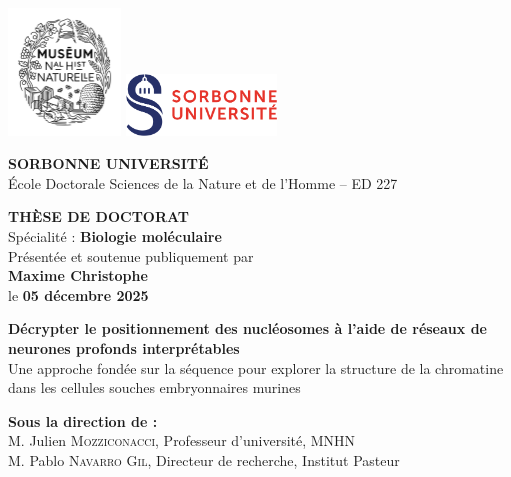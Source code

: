 \documentclass[11pt]{book}
\begin{document}
\begin{titlepage}
    \begin{center}
        \includegraphics[width=3cm]{Figures/MNHN_SCEAU_NOIR.png}
        \hspace{2cm}
        \includegraphics[width=4cm]{Figures/Logo_of_Sorbonne_University.svg.png}
        
        \vspace{0.5cm}
        \Large\textbf{SORBONNE UNIVERSITÉ}\\[0.2cm]
        \large{École Doctorale Sciences de la Nature et de l’Homme -- ED 227}\\[0.5cm]
        
        \fbox{\rule{12cm}{0pt}}
        
        \Large\textbf{THÈSE DE DOCTORAT}\\
        \normalsize{Spécialité : \textbf{Biologie moléculaire}}\\[0.4cm]
        
        Présentée et soutenue publiquement par\\
        \Large\textbf{Maxime Christophe}\\
        \normalsize{le \textbf{05 décembre 2025}}\\[0.8cm]
        
        \begin{spacing}{1.2}
        \Large\textbf{Décrypter le positionnement des nucléosomes à l’aide de réseaux de neurones profonds interprétables}\\[0.2cm]
        \large Une approche fondée sur la séquence pour explorer la structure de la chromatine dans les cellules souches embryonnaires murines
        \end{spacing}
        \vspace{0.2cm}
    \end{center}
        \normalsize\textbf{Sous la direction de :}\\
        M. Julien \textsc{Mozziconacci}, Professeur d'université, MNHN\\
        M. Pablo \textsc{Navarro Gil}, Directeur de recherche, Institut Pasteur\\
        

\end{titlepage}
\end{document}
